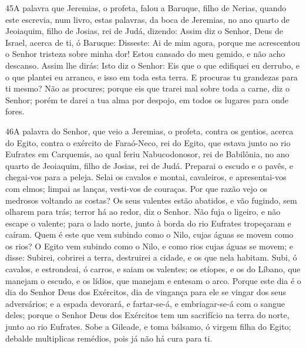 \medskip

\lettrine{45} A palavra que Jeremias, o profeta, falou a
Baruque, filho de Nerias, quando este escrevia, num livro, estas
palavras, da boca de Jeremias, no ano quarto de Jeoiaquim, filho de
Josias, rei de Judá, dizendo: Assim diz o Senhor, Deus de
Israel, acerca de ti, ó Baruque: Disseste: Ai de mim agora,
porque me acrescentou o Senhor tristeza sobre minha dor! Estou
cansado do meu gemido, e não acho descanso. Assim lhe dirás:
Isto diz o Senhor: Eis que o que edifiquei eu derrubo, e o que
plantei eu arranco, e isso em toda esta terra. E procuras tu
grandezas para ti mesmo? Não as procures; porque eis que trarei mal
sobre toda a carne, diz o Senhor; porém te darei a tua alma por
despojo, em todos os lugares para onde fores.

\medskip

\lettrine{46} A palavra do Senhor, que veio a Jeremias, o
profeta, contra os gentios, acerca do Egito, contra o exército
de Faraó-Neco, rei do Egito, que estava junto ao rio Eufrates em
Carquemis, ao qual feriu Nabucodonosor, rei de Babilônia, no ano
quarto de Jeoiaquim, filho de Josias, rei de Judá. Preparai o
escudo e o pavês, e chegai-vos para a peleja. Selai os cavalos e
montai, cavaleiros, e apresentai-vos com elmos; limpai as lanças,
vesti-vos de couraças. Por que razão vejo os medrosos voltando
as costas? Os seus valentes estão abatidos, e vão fugindo, sem
olharem para trás; terror há ao redor, diz o Senhor. Não fuja o
ligeiro, e não escape o valente; para o lado norte, junto à borda do
rio Eufrates tropeçaram e caíram. Quem é este que vem subindo
como o Nilo, cujas águas se movem como os rios? O Egito vem
subindo como o Nilo, e como rios cujas águas se movem; e disse:
Subirei, cobrirei a terra, destruirei a cidade, e os que nela
habitam. Subi, ó cavalos, e estrondeai, ó carros, e saiam os
valentes; os etíopes, e os do Líbano, que manejam o escudo, e os
lídios, que manejam e entesam o arco. Porque este dia é o dia
do Senhor Deus dos Exércitos, dia de vingança para ele se vingar dos
seus adversários; e a espada devorará, e fartar-se-á, e
embriagar-se-á com o sangue deles; porque o Senhor Deus dos
Exércitos tem um sacrifício na terra do norte, junto ao rio
Eufrates. Sobe a Gileade, e toma bálsamo, ó virgem filha do
Egito; debalde multiplicas remédios, pois já não há cura para ti.

